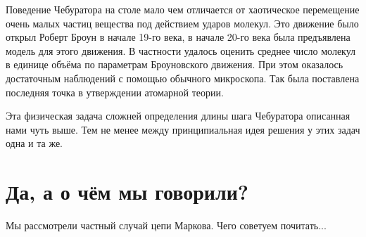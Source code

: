 \documentclass{article}
\begin{document}
Поведение Чебуратора на столе мало чем отличается 
от хаотическое перемещение очень малых частиц вещества под действием ударов молекул. 
Это движение было открыл Роберт Броун в начале 19-го века, 
в начале 20-го века была предъявлена модель для этого движения.
В частности удалось оценить среднее число молекул в единице объёма по параметрам Броуновского движения.
При этом оказалось достаточным наблюдений с помощью обычного микроскопа.
Так была поставлена последняя точка в утверждении атомарной теории.

Эта физическая задача сложней определения длины шага Чебуратора описанная нами чуть выше.
Тем не менее между принципиальная идея решения у этих задач одна и та же.

\section{Да, а о чём мы говорили?}

Мы рассмотрели частный случай цепи Маркова.
Чего советуем почитать...
\end{document}
